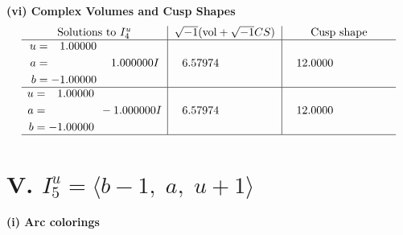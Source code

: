 \documentclass[1p]{elsarticle_modified}
\theoremstyle{definition}
\newcommand{\I}{\sqrt{-1}}
\begin{document}
\newpage\flushleft \textbf{(vi) Complex Volumes and Cusp Shapes}
$$\begin{array}{c|c|c}  
\text{Solutions to }I^u_{4}& \I (\text{vol} + \sqrt{-1}CS) & \text{Cusp shape}\\
 \hline 
\begin{aligned}
u &= \phantom{-}1.00000\phantom{ +0.000000I} \\
a &= \phantom{-0.000000 -}1.000000 I \\
b &= -1.00000\phantom{ +0.000000I}\end{aligned}
 & \phantom{-}6.57974\phantom{ +0.000000I} & \phantom{-}12.0000\phantom{ +0.000000I} \\ \hline\begin{aligned}
u &= \phantom{-}1.00000\phantom{ +0.000000I} \\
a &= \phantom{-0.000000 } -1.000000 I \\
b &= -1.00000\phantom{ +0.000000I}\end{aligned}
 & \phantom{-}6.57974\phantom{ +0.000000I} & \phantom{-}12.0000\phantom{ +0.000000I}\\
 \hline 
 \end{array}$$\newpage\newpage\renewcommand{\arraystretch}{1}
\centering \section*{V. $I^u_{5}= \langle b-1,\;a,\;u+1 \rangle$}
\flushleft \textbf{(i) Arc colorings}\\
\end{document}
